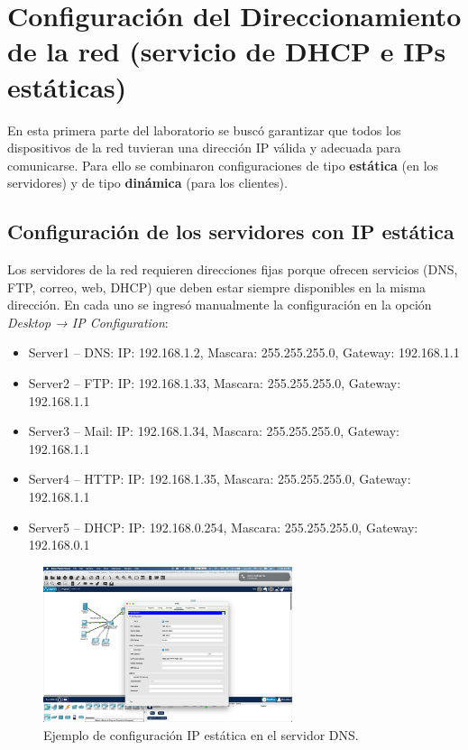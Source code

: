 \documentclass[10pt]{article}
\begin{document}
\renewcommand{\thesection}{4.\arabic{section}}
\setcounter{section}{0}
\section{Configuración del Direccionamiento de la red (servicio de DHCP e IPs estáticas)}

En esta primera parte del laboratorio se buscó garantizar que todos los dispositivos de la red tuvieran una dirección IP válida y adecuada para comunicarse. Para ello se combinaron configuraciones de tipo \textbf{estática} (en los servidores) y de tipo \textbf{dinámica} (para los clientes).

\subsection{Configuración de los servidores con IP estática}

Los servidores de la red requieren direcciones fijas porque ofrecen servicios (DNS, FTP, correo, web, DHCP) que deben estar siempre disponibles en la misma dirección. En cada uno se ingresó manualmente la configuración en la opción \textit{Desktop → IP Configuration}:

\begin{itemize}
    \item Server1 – DNS: IP: 192.168.1.2, Mascara: 255.255.255.0, Gateway: 192.168.1.1
    \item Server2 – FTP: IP: 192.168.1.33, Mascara: 255.255.255.0, Gateway: 192.168.1.1
    \item Server3 – Mail: IP: 192.168.1.34, Mascara: 255.255.255.0, Gateway: 192.168.1.1
    \item Server4 – HTTP: IP: 192.168.1.35, Mascara: 255.255.255.0, Gateway: 192.168.1.1
    \item Server5 – DHCP: IP: 192.168.0.254, Mascara: 255.255.255.0, Gateway: 192.168.0.1
\end{itemize}

\begin{figure}[H]
    \centering
    \includegraphics[width=0.65\textwidth]{lab-01-screenshots/41-1-DNS-ip-config.png}
    \caption{Ejemplo de configuración IP estática en el servidor DNS.}
\end{figure}
\end{document}
